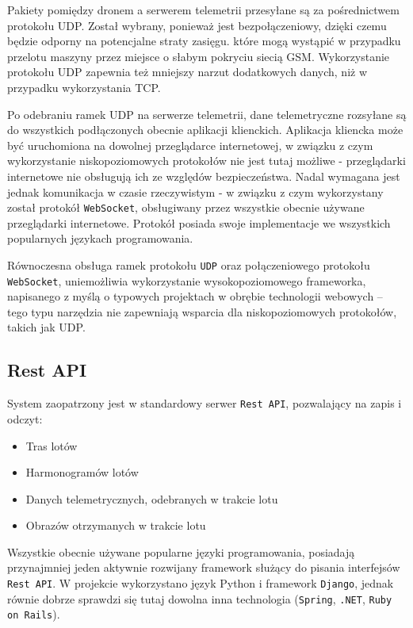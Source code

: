 Pakiety pomiędzy dronem a serwerem telemetrii przesyłane są za pośrednictwem protokołu
UDP. Został wybrany, ponieważ jest bezpołączeniowy, dzięki czemu będzie odporny na
potencjalne straty zasięgu. które mogą wystąpić w przypadku
przelotu maszyny przez miejsce o słabym pokryciu siecią GSM. Wykorzystanie protokołu
UDP zapewnia też mniejszy narzut dodatkowych danych, niż w przypadku wykorzystania
TCP.

Po odebraniu ramek UDP na serwerze telemetrii, dane telemetryczne rozsyłane są do
wszystkich podłączonych obecnie aplikacji klienckich. Aplikacja kliencka może
być uruchomiona na dowolnej przeglądarce internetowej, w związku z czym wykorzystanie
niskopoziomowych protokołów nie jest tutaj możliwe - przeglądarki internetowe nie 
obsługują ich ze względów bezpieczeństwa. Nadal wymagana jest jednak komunikacja
w czasie rzeczywistym - w związku z czym wykorzystany został protokół \texttt{WebSocket},
obsługiwany przez wszystkie obecnie używane przeglądarki internetowe. Protokół posiada
swoje implementacje we wszystkich popularnych językach programowania. 

Równoczesna obsługa ramek protokołu \texttt{UDP} oraz połączeniowego protokołu 
\texttt{WebSocket}, uniemożliwia wykorzystanie wysokopoziomowego frameworka,
napisanego z myślą o typowych projektach w obrębie technologii webowych --
tego typu narzędzia nie zapewniają wsparcia dla niskopoziomowych protokołów,
takich jak UDP.


\subsection{Rest API}

System zaopatrzony jest w standardowy serwer
\texttt{Rest API}\cite{principled_design_of_modern_web_apps},
pozwalający na zapis i odczyt:

\begin{itemize}
	\item Tras lotów
	\item Harmonogramów lotów
	\item Danych telemetrycznych, odebranych w trakcie lotu
	\item Obrazów otrzymanych w trakcie lotu
\end{itemize}

Wszystkie obecnie używane popularne języki programowania,
posiadają przynajmniej jeden aktywnie rozwijany framework 
służący do pisania interfejsów \texttt{Rest API}. W projekcie
wykorzystano język Python i framework \texttt{Django},
jednak równie dobrze sprawdzi się tutaj dowolna inna technologia
(\texttt{Spring}, \texttt{.NET}, \texttt{Ruby on Rails}).

